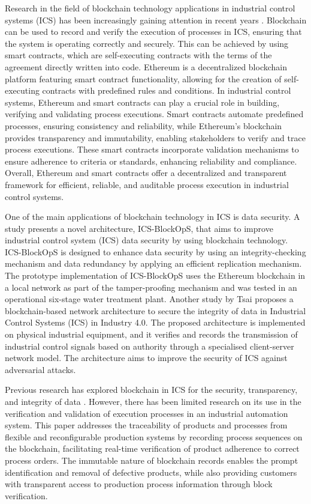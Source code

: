 \begin{bibunit}
Research in the field of blockchain technology applications in industrial control systems (ICS)  has been increasingly gaining attention in recent years \cite{maw2019ics,tsai2022blockchain}. Blockchain can be used to record and verify the execution of processes in ICS, ensuring that the system is operating correctly and securely. This can be achieved by using smart contracts, which are self-executing contracts with the terms of the agreement directly written into code. Ethereum \cite{buterin2014nextgeneration} is a decentralized blockchain platform featuring smart contract functionality, allowing for the creation of self-executing contracts with predefined rules and conditions. In industrial control systems, Ethereum and smart contracts can play a crucial role in building, verifying and validating process executions. Smart contracts automate predefined processes, ensuring consistency and reliability, while Ethereum's blockchain provides transparency and immutability, enabling stakeholders to verify and trace process executions. These smart contracts incorporate validation mechanisms to ensure adherence to criteria or standards, enhancing reliability and compliance. Overall, Ethereum and smart contracts offer a decentralized and transparent framework for efficient, reliable, and auditable process execution in industrial control systems.

One of the main applications of blockchain technology in ICS is data security.  A study \cite{maw2019ics} presents a novel architecture, ICS-BlockOpS, that aims to improve industrial control system (ICS) data security by using blockchain technology. ICS-BlockOpS is designed to enhance data security by using an integrity-checking mechanism and data redundancy by applying an efficient replication mechanism. The prototype implementation of ICS-BlockOpS uses the Ethereum blockchain in a local network as part of the tamper-proofing mechanism and was tested in an operational six-stage water treatment plant. Another study by Tsai \etal \cite{tsai2022blockchain} proposes a blockchain-based network architecture to secure the integrity of data in Industrial Control Systems (ICS) in Industry 4.0. The proposed architecture is implemented on physical industrial equipment, and it verifies and records the transmission of industrial control signals based on authority through a specialised client-server network model. The architecture aims to improve the security of ICS against adversarial attacks. 
 

Previous research has explored blockchain in ICS for the security, transparency, and integrity of data \cite{schorradt2019feasibility, stodt2021security}. However, there has been limited research on its use in the verification and validation of execution processes in an industrial automation system. This paper addresses the traceability of products and processes from flexible and reconfigurable production systems by recording process sequences on the blockchain, facilitating real-time verification of product adherence to correct process orders. The immutable nature of blockchain records enables the prompt identification and removal of defective products, while also providing customers with transparent access to production process information through block verification.


\end{bibunit}
